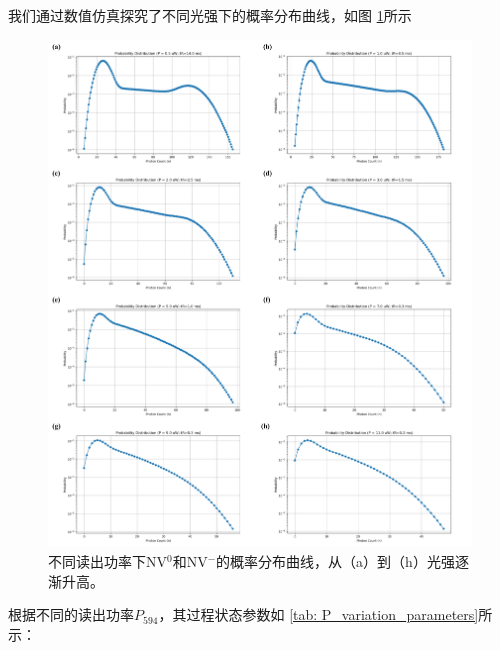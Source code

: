 \documentclass[type = bachelor]{whu-thesis}
\begin{document}
我们通过数值仿真探究了不同光强下的概率分布曲线，如图 \ref{fig: P_var_dist}所示
\begin{figure}
  \centering
  \includegraphics[width=1.0\textwidth]{figures/Chapter 5/P_var_dist.png}
  \caption[不同读出功率下NV$^0$和NV$^-$的概率分布曲线]{不同读出功率下NV$^0$和NV$^-$的概率分布曲线，从（a）到（h）光强逐渐升高。}
  \label{fig: P_var_dist}
\end{figure}
根据不同的读出功率$P_{594}$，其过程状态参数如 \ref{tab: P_variation_parameters}所示：
\end{document}
